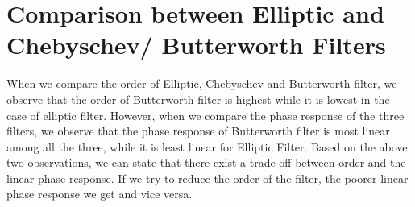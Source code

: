 \documentclass{article}
\begin{document}
\newpage

\section{Comparison between Elliptic and Chebyschev/ Butterworth Filters}

When we compare the order of Elliptic, Chebyschev and Butterworth filter, we observe that the order of Butterworth filter is highest while it is lowest in the case of elliptic filter. However, when we compare the phase response of the three filters, we observe that the phase response of Butterworth filter is most linear among all the three, while it is least linear for Elliptic Filter. Based on the above two observations, we can state that there exist a trade-off between order and the linear phase response. If we try to reduce the order of the filter, the poorer linear phase response we get and vice versa. 
\end{document}
